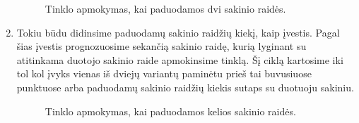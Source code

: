 \begin{enumerate}
\begin{figure}[h!]
  \caption{Tinklo apmokymas, kai paduodamos dvi sakinio raidės.}
  \label{fig:taikymas2}
  \end{figure}
  \item Tokiu būdu didinsime paduodamų sakinio raidžių kiekį, kaip įvestis. Pagal šias įvestis prognozuosime sekančią sakinio raidę, kurią lyginant su atitinkama duotojo sakinio raide apmokinsime tinklą. Šį ciklą kartosime iki tol kol įvyks vienas iš dviejų variantų paminėtu prieš tai buvusiuose punktuose arba paduodamų sakinio raidžių kiekis sutaps su duotuoju sakiniu.
  \begin{figure}[h!]
    \centering
  \caption{Tinklo apmokymas, kai paduodamos kelios sakinio raidės.}
  \label{fig:taikymas3}
  \end{figure}
\end{enumerate}
